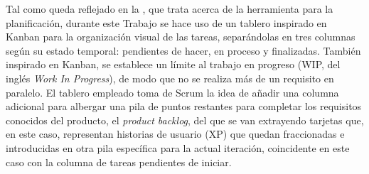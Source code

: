 Tal como queda reflejado en la , que trata acerca de la herramienta para la planificación, durante este Trabajo se hace uso de un tablero inspirado en Kanban para la organización visual de las tareas, separándolas en tres columnas según su estado temporal: pendientes de hacer, en proceso y finalizadas. También inspirado en Kanban, se establece un límite al trabajo en progreso (WIP, del inglés \textit{Work In Progress}), de modo que no se realiza más de un requisito en paralelo. El tablero empleado toma de Scrum la idea de añadir una columna adicional para albergar una pila de puntos restantes para completar los requisitos conocidos del producto, el \textit{product backlog}, del que se van extrayendo tarjetas que, en este caso, representan historias de usuario (XP) que quedan fraccionadas e introducidas en otra pila específica para la actual iteración, coincidente en este caso con la columna de tareas pendientes de iniciar.
